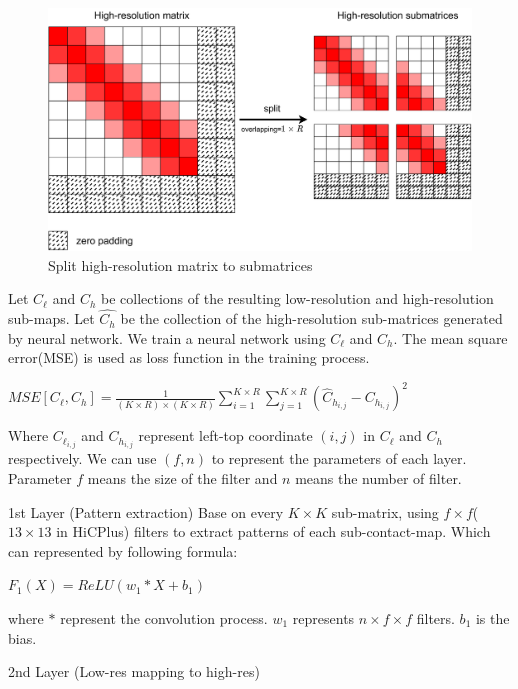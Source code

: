 \documentclass{article}
\begin{document}
\begin{figure}[htbp]
    \centering
    \includegraphics[scale=0.03]{figures/highres_split.png}
    \caption{Split high-resolution matrix to submatrices}
    \end{figure}


\noindent Let $C_\ell$ and $C_h$ be collections of the resulting low-resolution and high-resolution
sub-maps. Let $\hat{C_h}$ be the collection of the high-resolution sub-matrices generated by neural network. We train a neural network using $C_\ell$ and $C_h$. The mean square error(MSE) is used as 
loss function in the training process. 



\begin{center}
    $MSE[C_\ell, C_h] = \frac{1}{(K \times R)\times (K \times R)} \sum_{i=1}^{K \times R} \sum_{j=1}^{K \times R} (\hat{C}_{h_{i,j}}-C_{h_{i,j}})^2$
\end{center}
Where $C_{\ell_{i,j}}$ and $C_{h_{i,j}}$ represent left-top coordinate $(i,j)$ in $C_\ell$ and $C_h$ respectively.
\noindent We can use $(f,n)$ to represent the parameters of each layer. Parameter $f$ means the size of the filter and $n$ means the number of filter. 

\noindent 1st Layer (Pattern extraction)
Base on every $K \times K$ sub-matrix, using $f \times f$( $13 \times 13$ in HiCPlus) filters
to extract patterns of each sub-contact-map. Which can represented by following formula:
\begin{center}
$F_1(X) = ReLU(w_1 * X + b_1)$
\end{center}
where $*$ represent the convolution process. $w_1$ represents $n \times f \times f$ filters. 
$b_1$ is the bias.
 

\noindent 2nd Layer (Low-res mapping to high-res)
\end{document}
